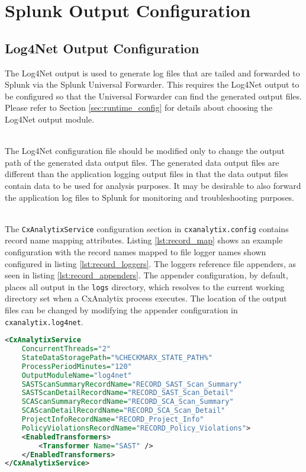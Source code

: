 \section{Splunk Output Configuration}\label{sec:splunk_config}
\subsection{Log4Net Output Configuration}\label{sec:log4net_out}

The Log4Net output is used to generate log files that are tailed and forwarded to Splunk via the Splunk Universal Forwarder.  This requires the Log4Net
output to be configured so that the Universal Forwarder can find the generated output files.  Please refer to Section \ref{sec:runtime_config} for details
about choosing the Log4Net output module.

\noindent\\The Log4Net configuration file should be modified only to change the output path of the generated data output files.  The generated data output files are different
than the application logging output files in that the data output files contain data to be used for analysis purposes. It may be desirable to also forward
the application log files to Splunk for monitoring and troubleshooting purposes.

\noindent\\The \texttt{CxAnalytixService} configuration section in \texttt{cxanalytix.config} contains record name mapping attributes.  Listing \ref{lst:record_map}
shows an example configuration with the record names mapped to file logger names shown configured in listing \ref{lst:record_loggers}.  The loggers
reference file appenders, as seen in listing \ref{lst:record_appenders}.  The appender configuration, by default, places all output in the \texttt{logs}
directory, which resolves to the current working directory set when a CxAnalytix process executes.  The location of the output files can be changed
by modifying the appender configuration in \texttt{cxanalytix.log4net}.


\begin{lstlisting}[caption={Example Record Map Configuration}, label={lst:record_map}, language=XML]
<CxAnalytixService 
    ConcurrentThreads="2" 
    StateDataStoragePath="%CHECKMARX_STATE_PATH%"
    ProcessPeriodMinutes="120"
    OutputModuleName="log4net"
    SASTScanSummaryRecordName="RECORD_SAST_Scan_Summary"
    SASTScanDetailRecordName="RECORD_SAST_Scan_Detail"
    SCAScanSummaryRecordName="RECORD_SCA_Scan_Summary"
    SCAScanDetailRecordName="RECORD_SCA_Scan_Detail"
    ProjectInfoRecordName="RECORD_Project_Info"
    PolicyViolationsRecordName="RECORD_Policy_Violations">
    <EnabledTransformers>
        <Transformer Name="SAST" />
    </EnabledTransformers>
</CxAnalytixService>
\end{lstlisting}

